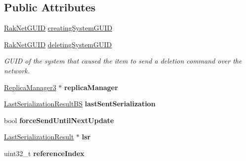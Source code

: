 \subsection*{Public Attributes}
\begin{DoxyCompactItemize}
\item 
\hyperlink{struct_rak_net_1_1_rak_net_g_u_i_d}{Rak\-Net\-G\-U\-I\-D} \hyperlink{class_rak_net_1_1_replica3_a02e865cdf4292bd4dd8c9795ebb3bb05}{creating\-System\-G\-U\-I\-D}
\item 
\hypertarget{class_rak_net_1_1_replica3_a7caafa3334eddc2697a1b41828b3a997}{\hyperlink{struct_rak_net_1_1_rak_net_g_u_i_d}{Rak\-Net\-G\-U\-I\-D} \hyperlink{class_rak_net_1_1_replica3_a7caafa3334eddc2697a1b41828b3a997}{deleting\-System\-G\-U\-I\-D}}\label{class_rak_net_1_1_replica3_a7caafa3334eddc2697a1b41828b3a997}

\begin{DoxyCompactList}\small\item\em G\-U\-I\-D of the system that caused the item to send a deletion command over the network. \end{DoxyCompactList}\item 
\hypertarget{class_rak_net_1_1_replica3_a836775e54b65d866e26b5eb1c6d2f5aa}{\hyperlink{class_rak_net_1_1_replica_manager3}{Replica\-Manager3} $\ast$ {\bfseries replica\-Manager}}\label{class_rak_net_1_1_replica3_a836775e54b65d866e26b5eb1c6d2f5aa}

\item 
\hypertarget{class_rak_net_1_1_replica3_a05577ac20a970b96b5a8a78f7b946ca6}{\hyperlink{struct_rak_net_1_1_last_serialization_result_b_s}{Last\-Serialization\-Result\-B\-S} {\bfseries last\-Sent\-Serialization}}\label{class_rak_net_1_1_replica3_a05577ac20a970b96b5a8a78f7b946ca6}

\item 
\hypertarget{class_rak_net_1_1_replica3_aa158eb98b54013a740f616dc05e2fd72}{bool {\bfseries force\-Send\-Until\-Next\-Update}}\label{class_rak_net_1_1_replica3_aa158eb98b54013a740f616dc05e2fd72}

\item 
\hypertarget{class_rak_net_1_1_replica3_ab980700d64845166660f7953a65a77d0}{\hyperlink{struct_rak_net_1_1_last_serialization_result}{Last\-Serialization\-Result} $\ast$ {\bfseries lsr}}\label{class_rak_net_1_1_replica3_ab980700d64845166660f7953a65a77d0}

\item 
\hypertarget{class_rak_net_1_1_replica3_a8d37d9e7b357f2c734a54d2221c62cac}{uint32\-\_\-t {\bfseries reference\-Index}}\label{class_rak_net_1_1_replica3_a8d37d9e7b357f2c734a54d2221c62cac}

\end{DoxyCompactItemize}
